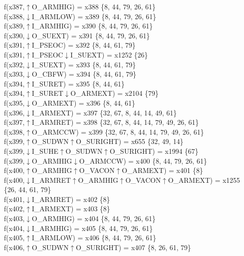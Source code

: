 f(x387,$\uparrow$O\_ARMHIG) = x388 \{8, 44, 79, 26, 61\} \\  
f(x388,$\downarrow$I\_ARMLOW) = x389 \{8, 44, 79, 26, 61\} \\  
f(x389,$\uparrow$I\_ARMHIG) = x390 \{8, 44, 79, 26, 61\} \\  
f(x390,$\downarrow$O\_SUEXT) = x391 \{8, 44, 79, 26, 61\} \\  
f(x391,$\uparrow$I\_PSEOC) = x392 \{8, 44, 61, 79\} \\  
f(x391,$\uparrow$I\_PSEOC$\downarrow$I\_SUEXT) = x1252 \{26\} \\  
f(x392,$\downarrow$I\_SUEXT) = x393 \{8, 44, 61, 79\} \\  
f(x393,$\downarrow$O\_CBFW) = x394 \{8, 44, 61, 79\} \\  
f(x394,$\uparrow$I\_SURET) = x395 \{8, 44, 61\} \\  
f(x394,$\uparrow$I\_SURET$\downarrow$O\_ARMEXT) = x2104 \{79\} \\  
f(x395,$\downarrow$O\_ARMEXT) = x396 \{8, 44, 61\} \\  
f(x396,$\downarrow$I\_ARMEXT) = x397 \{32, 67, 8, 44, 14, 49, 61\} \\  
f(x397,$\uparrow$I\_ARMRET) = x398 \{32, 67, 8, 44, 14, 79, 49, 26, 61\} \\  
f(x398,$\uparrow$O\_ARMCCW) = x399 \{32, 67, 8, 44, 14, 79, 49, 26, 61\} \\  
f(x399,$\uparrow$O\_SUDWN$\uparrow$O\_SURIGHT) = x655 \{32, 49, 14\} \\  
f(x399,$\downarrow$I\_SUHE$\uparrow$O\_SUDWN$\uparrow$O\_SURIGHT) = x1994 \{67\} \\  
f(x399,$\downarrow$O\_ARMHIG$\downarrow$O\_ARMCCW) = x400 \{8, 44, 79, 26, 61\} \\  
f(x400,$\uparrow$O\_ARMHIG$\uparrow$O\_VACON$\uparrow$O\_ARMEXT) = x401 \{8\} \\  
f(x400,$\downarrow$I\_ARMRET$\uparrow$O\_ARMHIG$\uparrow$O\_VACON$\uparrow$O\_ARMEXT) = x1255 \{26, 44, 61, 79\} \\  
f(x401,$\downarrow$I\_ARMRET) = x402 \{8\} \\  
f(x402,$\uparrow$I\_ARMEXT) = x403 \{8\} \\  
f(x403,$\downarrow$O\_ARMHIG) = x404 \{8, 44, 79, 26, 61\} \\  
f(x404,$\downarrow$I\_ARMHIG) = x405 \{8, 44, 79, 26, 61\} \\  
f(x405,$\uparrow$I\_ARMLOW) = x406 \{8, 44, 79, 26, 61\} \\  
f(x406,$\uparrow$O\_SUDWN$\uparrow$O\_SURIGHT) = x407 \{8, 26, 61, 79\} \\  
